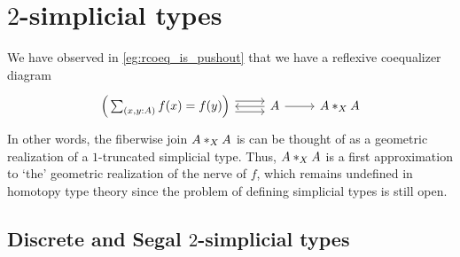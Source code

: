 \chapter{$2$-simplicial types}

We have observed in \cref{eg:rcoeq_is_pushout} that we have a reflexive coequalizer diagram
\begin{equation*}
\begin{tikzcd}
\Big(\sm{x,y:A}f(x)=f(y)\Big) \arrow[r,yshift=1ex] \arrow[r,yshift=-1ex] & A \arrow[l] \arrow[r] & \join[X]{A}{A}
\end{tikzcd}
\end{equation*}
In other words, the fiberwise join $\join[X]{A}{A}$ is can be thought of as a geometric realization of a $1$-truncated simplicial type. Thus, $\join[X]{A}{A}$ is a first approximation to `the' geometric realization of the nerve of $f$, which remains undefined in homotopy type theory since the problem of defining simplicial types is still open.

\section{Discrete and Segal $2$-simplicial types}

